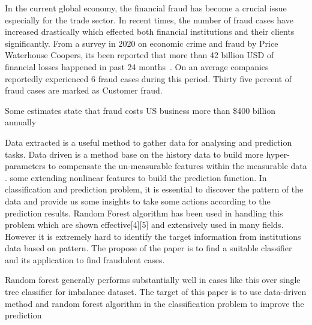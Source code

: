 
In the current global economy, the financial fraud has become a crucial issue especially for the trade sector. In recent times, the number of fraud cases have increased drastically which effected both financial institutions and their clients significantly. From a survey in 2020 on economic crime and fraud by Price Waterhouse Coopers, its been reported that more than 42 billion USD of financial losses happened in past 24 months~\cite{PwC.Crime.Surveey}. On an average companies reportedly experienced 6 fraud cases during this period. Thirty five percent of fraud cases are marked as Customer fraud.










Some estimates state that fraud costs US business more than \$400 billion annually

Data extracted is a useful method to gather data for analysing and prediction tasks. Data driven is a method base on the history data to build more hyper-parameters to compensate the un-measurable features within the measurable data \cite{SMARRA20181252}. some extending nonlinear features to build the prediction function. In classification and prediction problem, it is essential to discover the pattern of the data and provide us some insights to take some actions according to the prediction results. Random Forest algorithm has been used in handling this problem which are shown effective[4][5] and extensively used in many fields. However it is extremely hard to identify the target information from institutions data based on pattern. The propose of the paper is to find a suitable classifier and its application to find fraudulent cases. 

Random forest generally performs substantially well in cases like this over single tree classifier for imbalance dataset. The target of this paper is to use data-driven method and random forest algorithm in the classification problem to improve the prediction